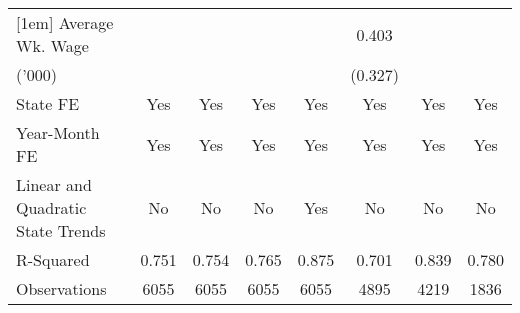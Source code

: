 {\begin{tabular}{l*{7}{c}}
[1em]
Average Wk. Wage    &                     &                     &                     &                     &       0.403         &                     &                     \\
('000)              &                     &                     &                     &                     &     (0.327)         &                     &                     \\
\hline
State FE            &         Yes         &         Yes         &         Yes         &         Yes         &         Yes         &         Yes         &         Yes         \\
Year-Month FE       &         Yes         &         Yes         &         Yes         &         Yes         &         Yes         &         Yes         &         Yes         \\
Linear and Quadratic State Trends&          No         &          No         &          No         &         Yes         &          No         &          No         &          No         \\
R-Squared           &       0.751         &       0.754         &       0.765         &       0.875         &       0.701         &       0.839         &       0.780         \\
Observations        &        6055         &        6055         &        6055         &        6055         &        4895         &        4219         &        1836         \\
\hline\hline
\end{tabular}
}

